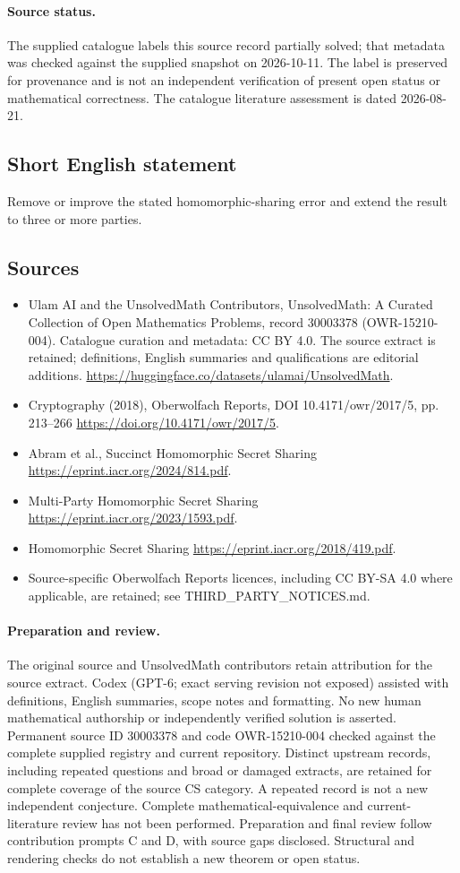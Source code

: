 \documentclass[11pt]{article}
\begin{document}
\paragraph{Source status.}
The supplied catalogue labels this source record partially solved; that metadata was checked against the supplied snapshot on 2026-10-11. The label is preserved for provenance and is not an independent verification of present open status or mathematical correctness. The catalogue literature assessment is dated 2026-08-21.
\subsection{Short English statement}
Remove or improve the stated homomorphic-sharing error and extend the result to three or more parties.
\subsection{Sources}
\begin{itemize}
\item[S1] Ulam AI and the UnsolvedMath Contributors, UnsolvedMath: A Curated Collection of Open Mathematics Problems, record 30003378 (OWR-15210-004). Catalogue curation and metadata: CC BY 4.0. The source extract is retained; definitions, English summaries and qualifications are editorial additions.
\url{https://huggingface.co/datasets/ulamai/UnsolvedMath}.
\item[S2] Cryptography (2018), Oberwolfach Reports, DOI 10.4171/owr/2017/5, pp. 213--266
\url{https://doi.org/10.4171/owr/2017/5}.
\item[S3] Abram et al., Succinct Homomorphic Secret Sharing
\url{https://eprint.iacr.org/2024/814.pdf}.
\item[S4] Multi-Party Homomorphic Secret Sharing
\url{https://eprint.iacr.org/2023/1593.pdf}.
\item[S5] Homomorphic Secret Sharing
\url{https://eprint.iacr.org/2018/419.pdf}.
\item Source-specific Oberwolfach Reports licences, including CC BY-SA 4.0 where applicable, are retained; see THIRD\_PARTY\_NOTICES.md.
\end{itemize}
\paragraph{Preparation and review.}
The original source and UnsolvedMath contributors retain attribution for the source extract. Codex (GPT-6; exact serving revision not exposed) assisted with definitions, English summaries, scope notes and formatting. No new human mathematical authorship or independently verified solution is asserted. Permanent source ID 30003378 and code OWR-15210-004 checked against the complete supplied registry and current repository. Distinct upstream records, including repeated questions and broad or damaged extracts, are retained for complete coverage of the source CS category. A repeated record is not a new independent conjecture. Complete mathematical-equivalence and current-literature review has not been performed. Preparation and final review follow contribution prompts C and D, with source gaps disclosed. Structural and rendering checks do not establish a new theorem or open status.
\label{end:30003378}
\end{document}
